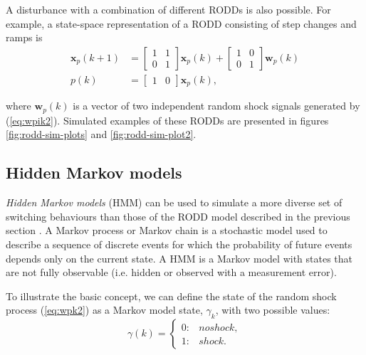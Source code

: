 A disturbance with a combination of different \gls{RODD}s is also possible.  For example, a state-space representation of a \gls{RODD} consisting of step changes and ramps is
\begin{equation} \label{eq:RODD-step-ramp}
	\begin{split}
		\mathbf{x}_p(k+1) & =\left[\begin{array}{cc}
			1 & 1 \\
			0 & 1
		\end{array}\right] \mathbf{x}_p(k) +\left[\begin{array}{cc}
			1 & 0 \\
			0 & 1
		\end{array}\right] \mathbf{w}_p(k) \\
		p(k) & =\left[\begin{array}{cc}
			1 & 0
		\end{array}\right] \mathbf{x}_p(k),
	\end{split}
\end{equation}

where $\mathbf{w}_p(k)$ is a vector of two independent random shock signals generated by (\ref{eq:wpik2}). Simulated examples of these \gls{RODD}s are presented in figures \ref{fig:rodd-sim-plots} and \ref{fig:rodd-sim-plot2}.

\subsection{Hidden Markov models} \label{sec:HMM}

\textit{Hidden Markov models} (\gls{HMM}) can be used to simulate a more diverse set of switching behaviours than those of the \gls{RODD} model described in the previous section \citep{wong_realistic_2009}. A Markov process or Markov chain is a stochastic model used to describe a sequence of discrete events for which the probability of future events depends only on the current state. A \gls{HMM} is a Markov model with states that are not fully observable (i.e. hidden or observed with a measurement error).

To illustrate the basic concept, we can define the state of the random shock process (\ref{eq:wpk2}) as a Markov model state, $\gamma_k$, with two possible values:
\begin{equation} \label{eq:gamma-k}
	\gamma(k) = 
	\begin{cases*}
		0: & no shock, \\
		1: & shock.
	\end{cases*}
\end{equation}
%

